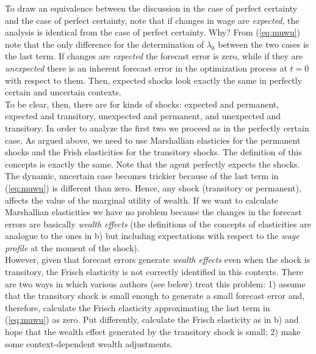 \documentclass[11pt]{article}
\begin{document}
To draw an equivalence between the discussion in the case of perfect certainty and the case of perfect certainty, note that if changes in wage are \textit{expected}, the analysis is identical from the case of perfect certainty. Why? From (\ref{eq:muwu}) note that the only difference for the determination of $\lambda_{0}$ between the two cases is the last term. If changes are \textit{expected} the forecast error is zero, while if they are \textit{unexpected} there is an inherent forecast error in the optimization process at $t=0$ with respect to them. Then, expected shocks look exactly the same in perfectly certain and uncertain contexts.\\
\indent To be clear, then, there are for kinds of shocks: expected and permanent, expected and transitory, unexpected and permanent, and unexpected and transitory. In order to analyze the first two we proceed as in the perfectly certain case. As argued above, we need to use Marshallian elasticies for the permanent shocks and the Frish elasticities for the transitory shocks. The definition of this concepts is exactly the same. Note that the agent perfectly expects the shocks. \\
\indent The dynamic, uncertain case becomes trickier because of the last term in (\ref{eq:muwu}) is different than zero. Hence, any shock (transitory or permanent), affects the value of the marginal utility of wealth. If we want to calculate Marshallian elasticities we have no problem because the changes in the forecast errors are basically \textit{wealth effects} (the definitions of the concepts of elasticities are analogue to the ones in b) but including expectations with respect to the \textit{wage profile} at the moment of the shock). \\
\indent However, given that forecast errors generate \textit{wealth effects} even when the shock is transitory, the Frisch elasticity is not correctly identified in this contexts. There are two ways in which various authors (see below) treat this problem: 1) assume that the transitory shock is small enough to generate a small forecast error and, therefore, calculate the Frisch elasticity approximating the last term in (\ref{eq:muwu}) as zero. Put differently, calculate the Frisch elasticity as in b) and hope that the wealth effect generated by the transitory shock is small; 2) make some context-dependent wealth adjustments. 
\end{document}
